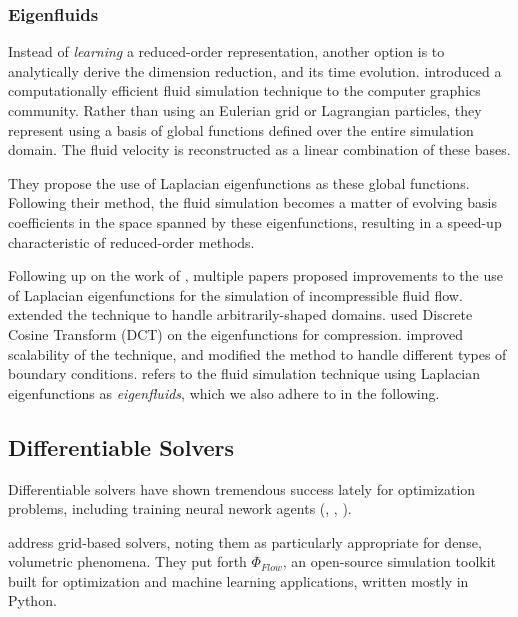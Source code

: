 \subsubsection*{Eigenfluids}
Instead of \textit{learning} a reduced-order representation, another option is
to analytically derive the dimension reduction, and its time evolution.
\cite{dewitt} introduced a computationally efficient fluid simulation technique
to the computer graphics community. Rather than using an Eulerian grid or
Lagrangian particles, they represent  using a basis of
global functions defined over the entire simulation domain. The fluid velocity
is reconstructed as a linear combination of these bases.

They propose the use of Laplacian eigenfunctions as these global functions.
Following their method, the fluid simulation becomes a matter of evolving basis
coefficients in the space spanned by these eigenfunctions, resulting in
a speed-up characteristic of reduced-order methods. 

Following up on the work of \cite{dewitt}, multiple papers proposed improvements
to the use of Laplacian eigenfunctions for the simulation of incompressible
fluid flow. \cite{ModelReductionFluidSim} extended the technique to handle
arbitrarily-shaped domains. \cite{EigenfluidCompression} used Discrete Cosine
Transform (DCT) on the eigenfunctions for compression.
\cite{scalable-eigenfluids} improved scalability of the technique, and modified
the method to handle different types of boundary conditions.
\cite{scalable-eigenfluids} refers to the fluid simulation technique using
Laplacian eigenfunctions as \textit{eigenfluids}, which we also adhere to in the
following.


\subsection{Differentiable Solvers}
Differentiable solvers have shown tremendous success lately for optimization
problems, including training neural nework agents
(\cite{holl2019pdecontrol}, \cite{difftaichi}, \cite{warp2022}).

\cite{holl2019pdecontrol} address grid-based solvers, noting them as
particularly appropriate for dense, volumetric phenomena. They put forth
$\Phi_{Flow}$, an open-source simulation toolkit built for optimization and
machine learning applications, written mostly in Python.

